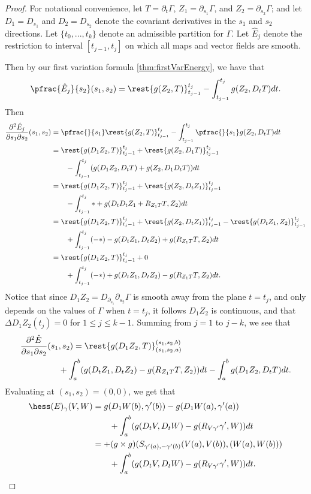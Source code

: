 \begin{proof}
For notational convenience, let $T=\partial_t\Gamma$, $Z_1=\partial_{s_1}\Gamma$, and $Z_2=\partial_{s_2}\Gamma$; and let $D_1=D_{s_1}$ and $D_2=D_{s_2}$ denote the covariant derivatives in the $s_1$ and $s_2$ directions.  Let $\{t_0,...,t_k\}$ denote an admissible partition for $\Gamma$.  Let $\hat{E}_j$ denote the restriction to interval $[t_{j-1},t_j]$ on which all maps and vector fields are smooth.

Then by our first variation formula \cref{thm:firstVarEnergy}, we have that
$$\pfrac{\hat{E}_j}{s_2}(s_1,s_2)=\rest{g(Z_2,T)}_{t_{j-1}}^{t_j}-\int_{t_{j-1}}^{t_j} g(Z_2,D_tT)dt.$$
Then
\begin{align*}
	\frac{\partial^2\hat{E}_j}{\partial s_1\partial s_2}(s_1,s_2)&=\pfrac{}{s_1}\rest{g(Z_2,T)}_{t_{j-1}}^{t_j}-\int_{t_{j-1}}^{t_j}\pfrac{}{s_1}g(Z_2,D_tT)dt\\
	&=\rest{g(D_1Z_2,T)}_{t_j-1}^{t_j}+\rest{g(Z_2,D_1T)}_{t_j-1}^{t_j}\\
	&\qquad -\int_{t_{j-1}}^{t_j}(g(D_1Z_2,D_tT)+g(Z_2,D_1D_tT))dt\\
	&=\rest{g(D_1Z_2,T)}_{t_j-1}^{t_j}+\rest{g(Z_2,D_tZ_1)}_{t_j-1}^{t_j}\\
	&\qquad -\int_{t_{j-1}}^{t_j}*+g(D_tD_tZ_1+R_{Z_1T}T,Z_2)dt\\
	&=\rest{g(D_1Z_2,T)}_{t_j-1}^{t_j}+\rest{g(Z_2,D_tZ_1)}_{t_j-1}^{t_j}-\rest{g(D_tZ_1,Z_2)}_{t_{j-1}}^{t_j}\\
	&\qquad+\int_{t_{j-1}}^{t_j}(-*)-g(D_tZ_1,D_tZ_2)+g(R_{Z_1T}T,Z_2)dt\\
	&=\rest{g(D_1Z_2,T)}_{t_j-1}^{t_j}+0\\
	&\qquad+\int_{t_{j-1}}^{t_j}(-*)+g(D_tZ_1,D_tZ_2)-g(R_{Z_1T}T,Z_2)dt.
\end{align*}
Notice that since $D_1Z_2=D_{\partial_{s_1}}\partial_{s_2}\Gamma$ is smooth away from the plane $t=t_j$, and only depends on the values of $\Gamma$ when $t=t_j$, it follows $D_1Z_2$ is continuous, and that $\Delta D_1Z_2(t_j)=0$ for $1\leq j\leq k-1$.  Summing from $j=1$ to $j-k$, we see that
\begin{align*}
	\frac{\partial^2\hat{E}}{\partial s_1\partial s_2}(s_1&,s_2)=\rest{g(D_1Z_2,T)}_{(s_1,s_2,a)}^{(s_1,s_2,b)}\\
	&+\int_a^b(g(D_tZ_1,D_tZ_2)-g(R_{Z_1T}T,Z_2))dt-\int_a^bg(D_1Z_2,D_tT)dt.
\end{align*}
Evaluating at $(s_1,s_2)=(0,0)$, we get that
\begin{align*}
	\hess(E)_\gamma(V,W)&=g(D_1W(b),\gamma'(b))-g(D_1W(a),\gamma'(a))\\
	&\qquad +\int_a^b(g(D_tV,D_tW)-g(R_{V\gamma'}\gamma',W))dt\\
	&=+(g\times g)(S_{\gamma'(a),-\gamma'(b)}(V(a),V(b)),(W(a),W(b)))\\
	&\qquad +\int_a^b(g(D_tV,D_tW)-g(R_{V\gamma'}\gamma',W))dt.
\end{align*}


\end{proof}
